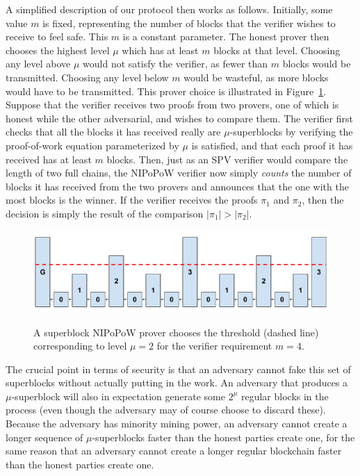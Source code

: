 A simplified description of our protocol then works as follows. Initially, some value
$m$ is fixed, representing the number of blocks that the verifier wishes to
receive to feel safe. This $m$ is a constant parameter. The honest prover then
chooses the highest level $\mu$ which has at least $m$ blocks at that level.
Choosing any level above $\mu$ would not satisfy the verifier, as fewer than $m$
blocks would be transmitted. Choosing any level below $m$ would be wasteful, as
more blocks would have to be transmitted. This prover choice is illustrated in
Figure~\ref{fig.level-threshold}. Suppose that the verifier receives two
proofs from two provers, one of which is honest while the other adversarial, and
wishes to compare them. The verifier first checks that all the blocks it has
received really are $\mu$-superblocks by verifying the proof-of-work equation
parameterized by $\mu$ is satisfied, and that each proof it has received has at
least $m$ blocks. Then, just as an SPV verifier would compare the length of two
full chains, the NIPoPoW verifier now simply \emph{counts} the number of blocks
it has received from the two provers and announces that the one with the most
blocks is the winner. If the verifier receives the proofs $\pi_1$ and $\pi_2$,
then the decision is simply the result of the comparison $|\pi_1| > |\pi_2|$.

\begin{figure}[ht]
    \caption{A superblock NIPoPoW prover chooses the threshold (dashed line)
    corresponding to level $\mu = 2$ for the verifier requirement $m = 4$.}
    \centering
    \includegraphics[width=0.7\columnwidth,keepaspectratio]{chapters/introduction/figures/level-threshold.pdf}
    \label{fig.level-threshold}
\end{figure}

The crucial point in terms of security is that an adversary cannot fake this
set of superblocks without actually putting in the work. An adversary that
produces a $\mu$-superblock will also in expectation generate some $2^\mu$
regular blocks in the process (even though the adversary may of course choose
to discard these). Because the adversary has minority mining power, an adversary
cannot create a longer sequence of $\mu$-superblocks faster than the honest
parties create one, for the same reason that an adversary cannot create a longer
regular blockchain faster than the honest parties create one.


